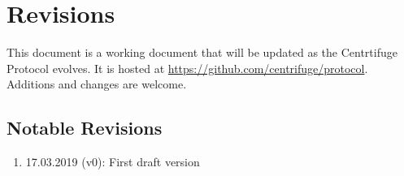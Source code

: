 \section{Revisions}
\label{sec:revisions}
This document is a working document that will be updated as the Centrtifuge Protocol evolves. It is hosted at \url{https://github.com/centrifuge/protocol}. Additions and changes are welcome. 
\subsection{Notable Revisions}
\begin{enumerate}
    \item 17.03.2019 (v0): First draft version
\end{enumerate}
